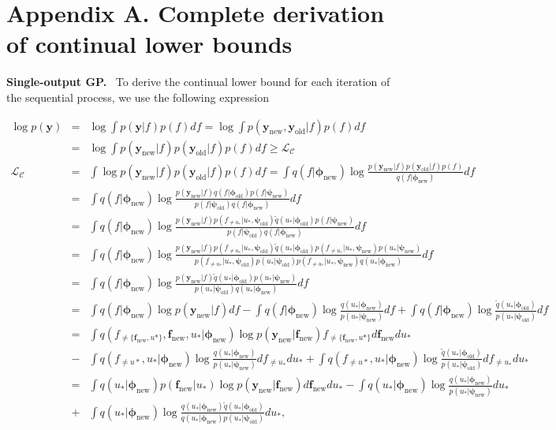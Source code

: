 \documentclass[]{article}
\def\f{{\mathbf f}}
\newcommand{\psiold}{{\bm{\psi}_{\text{old}}}}
\newcommand{\psinew}{{\bm{\psi}_{\text{new}}}}
\newcommand{\fnew}{{\f_{\text{new}}}}
\newcommand{\yc}{\bm{y}}
\newcommand{\ycnew}{{\yc_{\text{new}}}}
\newcommand{\ycold}{{\yc_{\text{old}}}}
\newcommand{\phiold}{{\bm{\phi}_{\text{old}}}}
\newcommand{\phinew}{{\bm{\phi}_{\text{new}}}}
\begin{document}
\newpage

\appendix
\section*{Appendix A. Complete derivation of continual lower bounds}
\label{app:derivation}

\textbf{Single-output GP.}~ To derive the continual lower bound for each iteration of the sequential process, we use the following expression

\begin{eqnarray}
\log p(\yc) &=& \log \int p(\yc|f)p(f)df =  \log \int p(\ycnew, \ycold|f)p(f)df  \\
&=&  \log \int p(\ycnew| f) p(\ycold|f) p(f)df \geq \mathcal{L}_{\mathcal{C}} \\
\mathcal{L}_{\mathcal{C}} &=&  \int \log p(\ycnew| f) p(\ycold|f) p(f)df = \int q(f|\phinew) \log \frac{p(\ycnew| f) p(\ycold|f) p(f)}{q(f|\phinew)}df \\
&=& \int q(f|\phinew) \log \frac{p(\ycnew| f) q(f|\phiold) p(f|\psinew)}{p(f|\psiold)q(f|\phinew)}df \\
&=& \int q(f|\phinew) \log \frac{p(\ycnew| f) p(f_{\neq u_{*}}|u_{*}, \psiold)\widetilde{q}(u_{*}|\phiold) p(f|\psinew)}{p(f|\psiold)q(f|\phinew)}df \\
&=& \int q(f|\phinew) \log \frac{p(\ycnew| f) p(f_{\neq u_{*}}|u_{*}, \psiold)\widetilde{q}(u_{*}|\phiold) p(f_{\neq u_{*}}|u_{*}, \psinew) p(u_{*}|\psinew)}{p(f_{\neq u_{*}}|u_{*}, \psiold)p(u_{*}|\psiold)p(f_{\neq u_{*}}|u_{*}, \psinew)q(u_{*}|\phinew)}df \\
&=& \int q(f|\phinew) \log \frac{p(\ycnew| f) \widetilde{q}(u_{*}|\phiold)  p(u_{*}|\psinew)}{ p(u_{*}|\psiold)q(u_{*}|\phinew)}df \\
&=& \int q(f|\phinew) \log p(\ycnew| f)df - \int q(f|\phinew) \log \frac{q(u_{*}|\phinew)}{p(u_{*}|\psinew)}df +\int q(f|\phinew) \log \frac{\widetilde{q}(u_{*}|\phiold)}{p(u_{*}|\psiold)}df \nonumber \\
&=& \int q(f_{\neq \{\fnew, u{*}\}}, \fnew, u_{*} |\phinew) \log p(\ycnew| \fnew)f_{\neq \{\fnew, u{*}\}} d\fnew du_{*} \nonumber \\
&-& \int q(f_{\neq u{*}}, u_{*}|\phinew) \log \frac{q(u_{*}|\phinew)}{p(u_{*}|\psinew)} df_{\neq u_{*}} du_{*} + \int q(f_{\neq u{*}}, u_{*}|\phinew) \log \frac{\widetilde{q}(u_{*}|\phiold)}{p(u_{*}|\psiold)} df_{\neq u_{*}} du_{*} \\
&=& \int q(u_{*}|\phinew)p(\fnew|u_{*}) \log p(\ycnew| \fnew )d\fnew du_{*} - \int q(u_{*}|\phinew) \log \frac{q(u_{*}|\phinew)}{p(u_{*}|\psinew)}du_{*} \nonumber\\
&+&\int q(u_{*}|\phinew) \log \frac{q(u_{*}|\phinew) \widetilde{q}(u_{*}|\phiold)}{q(u_{*}|\phinew) p(u_{*}|\psiold)}du_{*},
\end{eqnarray}
\end{document}
